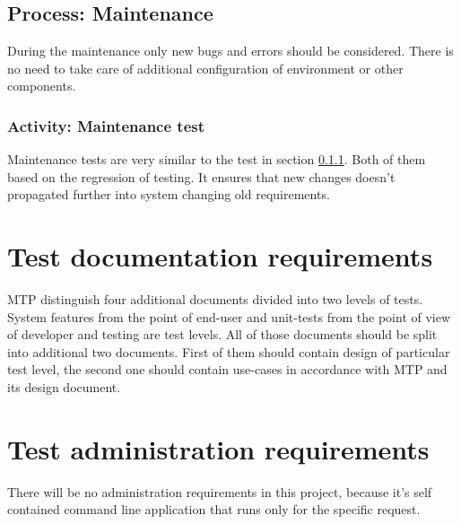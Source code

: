	\subsection{Process: Maintenance} \label{s:details-of-the-master-test-plan:process-maintenance}
		During the maintenance only new bugs and errors should be considered. There is no need to take care of additional configuration of environment or other components.
		\subsubsection{Activity: Maintenance test} \label{s:details-of-the-master-test-plan:activity-maintenance-test}
		Maintenance tests are very similar to the test in section \ref{s:details-of-the-master-test-plan:activity-maintenance-test}. Both of them based on the regression of testing. It ensures that new changes doesn't propagated further into system changing old requirements. 
\section{Test documentation requirements} \label{s:details-of-the-master-test-plan:test-documentation-requirements}
	\begin{comment}
		$<$Define the purpose, format, and content of all other testing documents that are to be used (in addition to those that are defined in MTP Section 2.4). A description of these documents may be found in Clause 9 through Clause 16. If the test effort uses test documentation or test levels different from those in this standard (i.e., component, component integration, system, and acceptance), this section needs to map the documentation and process requirements to the test documentation contents defined in this standard. $>$
	\end{comment}
	\gls{MTP} distinguish four additional documents divided into two levels of tests. System features from the point of end-user and unit-tests from the point of view of developer and testing are test levels. All of those documents should be split into additional two documents. First of them should contain design of particular test level, the second one should contain use-cases in accordance with \gls{MTP} and its design document.
	
\section{Test administration requirements} \label{s:details-of-the-master-test-plan:test-administration-requirements}
	\begin{comment}
		$<$ Describe the anomaly resolution and reporting processes, task iteration policy, deviation policy, control procedures and standards, practices, and conventions. These activities are needed to administer the tests during execution. $>$
	\end{comment}
	There will be no administration requirements in this project, because it's self contained command line application that runs only for the specific request.
